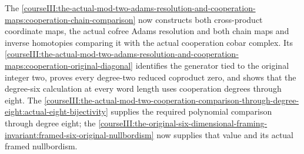 The \cref{courseIII:the-actual-mod-two-adams-resolution-and-cooperation-maps:cooperation-chain-comparison} now constructs both cross-product coordinate maps, the actual cofree Adams resolution and both chain maps and inverse homotopies comparing it with the actual cooperation cobar complex. Its \cref{courseIII:the-actual-mod-two-adams-resolution-and-cooperation-maps:cooperation-original-diagonal} identifies the generator tied to the original integer two, proves every degree-two reduced coproduct zero, and shows that the degree-six calculation at every word length uses cooperation degrees through eight. The \cref{courseIII:the-actual-mod-two-cooperation-comparison-through-degree-eight:actual-eight-bijectivity} supplies the required polynomial comparison through degree eight; the \cref{courseIII:the-original-six-dimensional-framing-invariant:framed-six-original-nullbordism} now supplies that value and its actual framed nullbordism.

